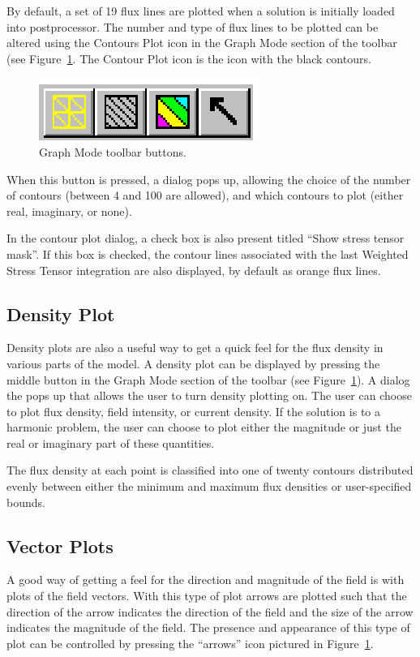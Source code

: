 \documentclass[12pt]{report}
\begin{document}
By default, a set of 19 flux lines are plotted when a solution is
initially loaded into postprocessor.  The number and type of flux
lines to be plotted can be altered using the Contours Plot icon in
the Graph Mode section of the toolbar (see Figure~\ref{graph_mode}.
The Contour Plot icon is the icon with the black contours.
\begin{figure}
\centerline{\includegraphics{hplotbar.ps}}
\caption{Graph Mode toolbar buttons.}
\label{graph_mode}
\end{figure}
When this button is pressed, a dialog pops up, allowing the choice
of the number of contours (between 4 and 100 are allowed), and
which contours to plot (either real, imaginary, or none).

In the contour plot dialog, a check box is also present titled
``Show stress tensor mask''. If this box is checked, the contour
lines associated with the last Weighted Stress Tensor integration
are also displayed, by default as orange flux lines.

\subsection{Density Plot}
Density plots are also a useful way to get a quick feel for the
flux density in various parts of the model.  A density plot can be displayed
by pressing the middle button in
the Graph Mode section of the toolbar (see
Figure~\ref{graph_mode}).  A dialog the pops up that allows the
user to turn density plotting on.  The user can choose to plot
flux density, field intensity, or current density. If the solution is to a harmonic
problem, the user can choose to plot either the magnitude or just the real
or imaginary part of these quantities.

The flux density at each point is classified into one of twenty contours
distributed evenly between either the minimum and maximum flux densities or
user-specified bounds.

\subsection{Vector Plots}
A good way of getting a feel for the direction and magnitude of the
field is with plots of the field vectors. With this type of plot
arrows are plotted such that the direction of the arrow indicates
the direction of the field and the size of the arrow indicates the
magnitude of the field. The presence and appearance of this type of
plot can be controlled by pressing the ``arrows'' icon pictured in
Figure~\ref{graph_mode}.
\end{document}
